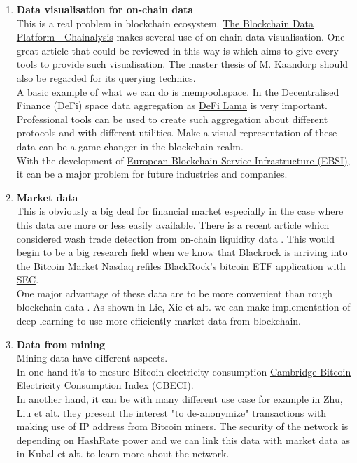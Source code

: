\documentclass[12pt]{article}
\begin{document}
\begin{enumerate}
\item {\bf Data visualisation for on-chain data} \\
This is a real problem in blockchain ecosystem. \href{https://www.chainalysis.com/\#Products}{The Blockchain Data Platform - Chainalysis} makes several use of on-chain data visualisation. One great article that could be reviewed in this way is \cite{data-viz} which aims to give every tools to provide such visualisation. The master thesis of M. Kaandorp \cite{query-thesis} should also be regarded for its querying technics.\\
A basic example of what we can do is \url{mempool.space}. 
In the Decentralised Finance (DeFi) space data aggregation as \href{https://defillama.com/}{DeFi Lama} is very important. Professional tools can be used to create such aggregation about different protocols and with different utilities. Make a visual representation of these data can be a game changer in the blockchain realm.\\
With the development of  \href{https://ec.europa.eu/digital-building-blocks/code/projects/EBSI}{European Blockchain Service Infrastructure (EBSI)}, it can be a major problem for future industries and companies. 


\item {\bf Market data}\\ 
This is obviously a big deal for financial market especially in the case where this data are more or less easily available. There is a recent article which considered wash trade detection from on-chain liquidity data \cite{wash-trade}. This would begin to be a big research field when we know that Blackrock is arriving into the Bitcoin Market \href{https://www.reuters.com/technology/nasdaq-refiles-blackrocks-bitcoin-etf-application-with-sec-2023-07-03/}{Nasdaq refiles BlackRock's bitcoin ETF application with SEC}. \\
One major advantage of these data are to be more convenient than rough blockchain data \cite{finance-blch}. As shown in Lie, Xie et alt. \cite{deep-learning-blch} we can make implementation of deep learning to use more efficiently market data from blockchain. 

\item {\bf Data from mining}\\ 
Mining data have different aspects.\\ 
In one hand it's to mesure Bitcoin electricity consumption \cite{mining-elec, bitcoin-mining-elec} \href{https://ccaf.io/cbnsi/cbeci}{Cambridge Bitcoin Electricity Consumption Index (CBECI)}.\\ 
In another hand, it can be with many different use case for example in Zhu, Liu et alt. \cite{mining-data} they present the interest "to de-anonymize" transactions with making use of IP address from Bitcoin miners. The security of the network is depending on HashRate power \cite{security-btc} and we can link this data with market data as in Kubal et alt. \cite{price-security-btc} to learn more about the network.


\end{enumerate}
\end{document}
